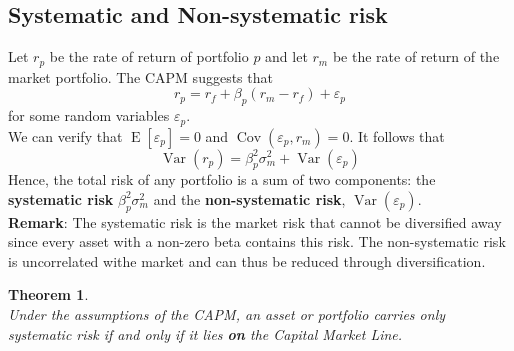 \documentclass[12pt]{article}
\newtheorem{theorem}{Theorem}[section]
\theoremstyle{definition}
\DeclareMathOperator{\expec}{E}
\DeclareMathOperator{\var}{Var}
\DeclareMathOperator{\cov}{Cov}
\begin{document}
\subsection{Systematic and Non-systematic risk}
Let $r_p$ be the rate of return of portfolio $p$ and let $r_m$ be the rate of return of the market portfolio. The CAPM suggests that
\[
r_p = r_f +\beta_p(r_m-r_f)+\varepsilon_p
\]
for some random variables $\varepsilon_p$.\\
We can verify that $\expec[\varepsilon_p]=0$ and $\cov(\varepsilon_p,r_m)=0$. It follows that
\[
\var(r_p)=\beta_p^2\sigma_m^2+\var(\varepsilon_p)
\]
Hence, the total risk of any portfolio is a sum of two components: the \textbf{systematic risk} $\beta_p^2\sigma_m^2$ and the \textbf{non-systematic risk}, $\var(\varepsilon_p)$.\\
\textbf{Remark}: The systematic risk is the market risk that cannot be diversified away since every asset with a non-zero beta contains this risk. The non-systematic risk is uncorrelated withe market and can thus be reduced through diversification.
\begin{theorem}\hfill\\\normalfont
Under the assumptions of the CAPM, an asset or portfolio carries only systematic risk \textit{if and only if} it lies \textbf{on} the Capital Market Line.
\end{theorem}
\clearpage
\end{document}
